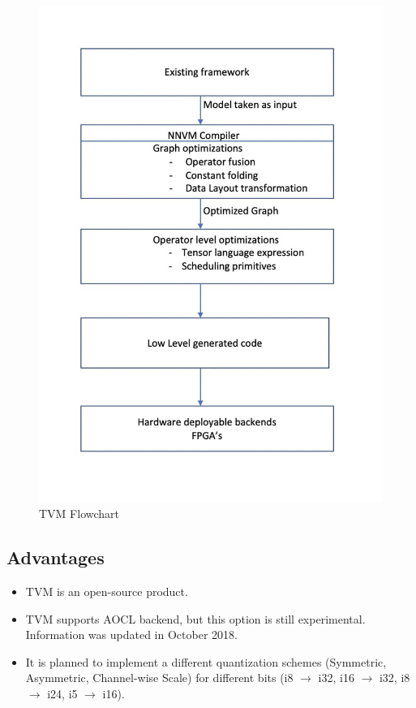 \begin{figure}[h!]
    \centering
    \includegraphics[scale=0.30]{TVM.png}
    \caption{TVM Flowchart}
\end{figure}
 
 \subsection{Advantages}
 \begin{itemize}
 \item TVM is an open-source product.
 \item TVM supports AOCL backend, but this option is still experimental. Information was updated in October 2018.
  \item It is planned to implement a different quantization schemes (Symmetric, Asymmetric, Channel-wise Scale) for different bits (i8 $\to$ i32, i16 $\to$ i32, i8 $\to$ i24, i5 $\to$ i16).
 \end{itemize}

